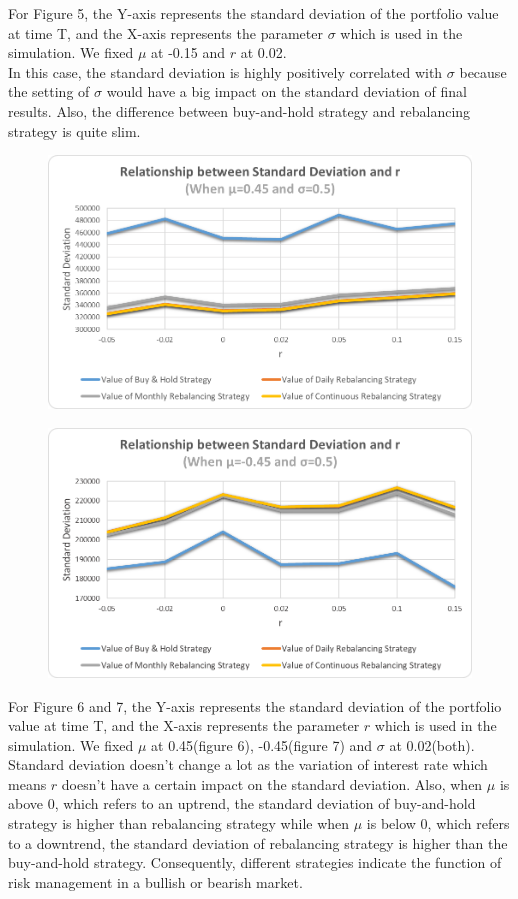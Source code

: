 \documentclass[
10pt, %
a4paper, %
oneside, %
headinclude,footinclude, %
BCOR5mm, %
]{scrartcl}
\begin{document}
For Figure 5, the Y-axis represents the standard deviation of the portfolio value at time T, and the X-axis represents the parameter $\sigma$ which is used in the simulation. We fixed $\mu$ at -0.15 and $r$ at 0.02.\\

In this case, the standard deviation is highly positively correlated with $\sigma$ because the setting of $\sigma$ would have a big impact on the standard deviation of final results. Also, the difference between buy-and-hold strategy and rebalancing strategy is quite slim. \\


\begin{figure}[H]
	\centering
	\includegraphics[width=0.7\linewidth]{std_r_045_050}
	\caption{}
	\label{fig:stdr045050}
\end{figure}

\begin{figure}[H]
	\centering
	\includegraphics[width=0.7\linewidth]{std_r_-045_050}
	\caption{}
	\label{fig:stdr-045050}
\end{figure}
For Figure 6 and 7, the Y-axis represents the standard deviation of the portfolio value at time T, and the X-axis represents the parameter $r$ which is used in the simulation. We fixed $\mu$ at 0.45(figure 6), -0.45(figure 7) and $\sigma$ at 0.02(both).\\

Standard deviation doesn’t change a lot as the variation of interest rate which means $r$ doesn't have a certain impact on the standard deviation. Also, when $\mu$ is above 0, which refers to an uptrend, the standard deviation of buy-and-hold strategy is higher than rebalancing strategy while when $\mu$ is below 0, which refers to a downtrend, the standard deviation of rebalancing strategy is higher than the buy-and-hold strategy. Consequently, different strategies indicate the function of risk management in a bullish or bearish market. \\
\end{document}
